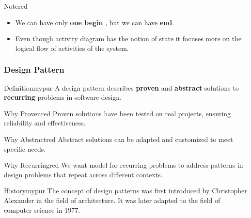 \vspace{0.25cm}

\begin{prettyBox}{Note}{red}
\begin{itemize}
    \item We can have only \textbf{one begin} , but we can have \textbf{end}.
    \item Even though activity diagram has the notion of state it focuses more on the 
    logical flow of activities of the system.
\end{itemize}
\end{prettyBox}


\subsubsection{Design Pattern}

\begin{prettyBox}{Definition}{mypur}
A design pattern describes \textbf{proven} and \textbf{abstract} solutions  
to \textbf{recurring} problems in software design.
\end{prettyBox}


\vspace{0.25cm}
\begin{prettyBox}{Why Proven}{red}
Proven solutions have been tested on real projects, ensuring reliability and effectiveness.
\end{prettyBox}

\vspace{0.25cm}
\begin{prettyBox}{Why Abstract}{red}
Abstract solutions can be adapted and customized to meet specific needs.
\end{prettyBox}

\vspace{0.25cm}
\begin{prettyBox}{Why Recurring}{red}
We want model for recurring problems to address patterns in design problems that repeat across different contexts.
\end{prettyBox}

\vspace{0.25cm}

\begin{prettyBox}{History}{mypur}
The concept of design patterns was first introduced by Christopher Alexander
in the field of architecture. It was later adapted to the field of computer
science in 1977.
\end{prettyBox}

